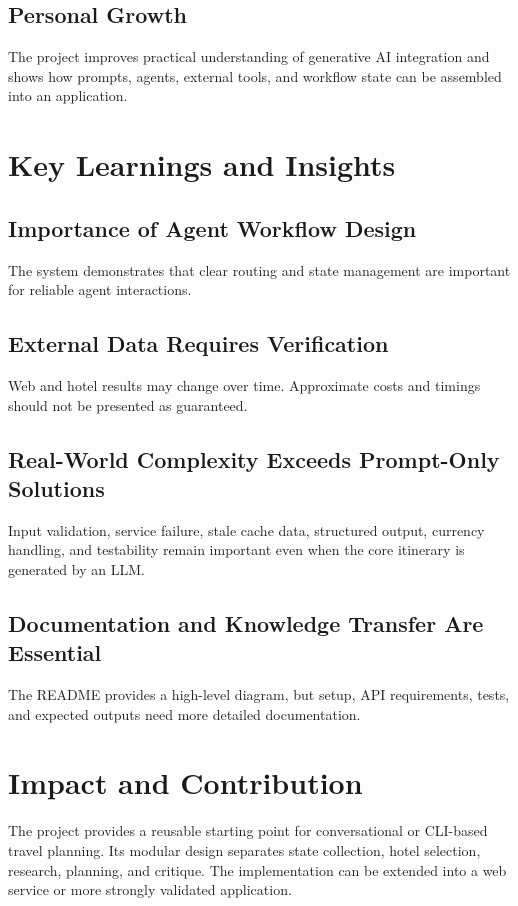 \documentclass[12pt,a4paper]{report}
\begin{document}
\subsection{Personal Growth}
\label{subsec:personal-growth}
The project improves practical understanding of generative AI integration and shows how prompts,
agents, external tools, and workflow state can be assembled into an application.

\section{Key Learnings and Insights}
\label{sec:key-learnings}

\subsection{Importance of Agent Workflow Design}
\label{subsec:agent-workflow-learning}
The system demonstrates that clear routing and state management are important for reliable agent
interactions.

\subsection{External Data Requires Verification}
\label{subsec:external-data-verification}
Web and hotel results may change over time. Approximate costs and timings should not be presented
as guaranteed.

\subsection{Real-World Complexity Exceeds Prompt-Only Solutions}
\label{subsec:real-world-complexity}
Input validation, service failure, stale cache data, structured output, currency handling, and
testability remain important even when the core itinerary is generated by an LLM.

\subsection{Documentation and Knowledge Transfer Are Essential}
\label{subsec:documentation-transfer}
The README provides a high-level diagram, but setup, API requirements, tests, and expected
outputs need more detailed documentation.

\section{Impact and Contribution}
\label{sec:impact-contribution}
The project provides a reusable starting point for conversational or CLI-based travel planning.
Its modular design separates state collection, hotel selection, research, planning, and critique.
The implementation can be extended into a web service or more strongly validated application.
\end{document}
